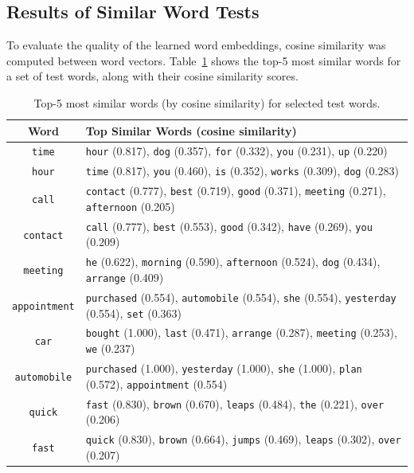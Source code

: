 \documentclass[11pt]{article}
\begin{document}
\subsection{Results of Similar Word Tests}

To evaluate the quality of the learned word embeddings, cosine similarity was computed between word vectors. Table~\ref{tab:similarity} shows the top-5 most similar words for a set of test words, along with their cosine similarity scores.

\begin{table}[H]
  \centering
  \caption{Top-5 most similar words (by cosine similarity) for selected test words.}
  \label{tab:similarity}
  \small
  \begin{tabular}{cl}
    \toprule
    Word & Top Similar Words (cosine similarity) \\
    \midrule
    \texttt{time} & \texttt{hour} (0.817), \texttt{dog} (0.357), \texttt{for} (0.332), \texttt{you} (0.231), \texttt{up} (0.220) \\
    \texttt{hour} & \texttt{time} (0.817), \texttt{you} (0.460), \texttt{is} (0.352), \texttt{works} (0.309), \texttt{dog} (0.283) \\
    \texttt{call} & \texttt{contact} (0.777), \texttt{best} (0.719), \texttt{good} (0.371), \texttt{meeting} (0.271), \texttt{afternoon} (0.205) \\
    \texttt{contact} & \texttt{call} (0.777), \texttt{best} (0.553), \texttt{good} (0.342), \texttt{have} (0.269), \texttt{you} (0.209) \\
    \texttt{meeting} & \texttt{he} (0.622), \texttt{morning} (0.590), \texttt{afternoon} (0.524), \texttt{dog} (0.434), \texttt{arrange} (0.409) \\
    \texttt{appointment} & \texttt{purchased} (0.554), \texttt{automobile} (0.554), \texttt{she} (0.554), \texttt{yesterday} (0.554), \texttt{set} (0.363) \\
    \texttt{car} & \texttt{bought} (1.000), \texttt{last} (0.471), \texttt{arrange} (0.287), \texttt{meeting} (0.253), \texttt{we} (0.237) \\
    \texttt{automobile} & \texttt{purchased} (1.000), \texttt{yesterday} (1.000), \texttt{she} (1.000), \texttt{plan} (0.572), \texttt{appointment} (0.554) \\
    \texttt{quick} & \texttt{fast} (0.830), \texttt{brown} (0.670), \texttt{leaps} (0.484), \texttt{the} (0.221), \texttt{over} (0.206) \\
    \texttt{fast} & \texttt{quick} (0.830), \texttt{brown} (0.664), \texttt{jumps} (0.469), \texttt{leaps} (0.302), \texttt{over} (0.207) \\
    \bottomrule
  \end{tabular}
\end{table}
\end{document}
